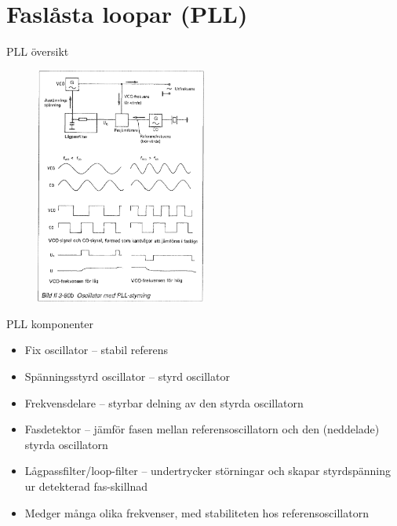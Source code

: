 \documentclass{beamer}
\begin{document}
\section{Faslåsta loopar (PLL)}

\begin{frame}{PLL översikt}

\begin{figure}[h]
\includegraphics[width=0.5\textwidth]{images/bild_2_3-80b}
\end{figure}

\end{frame}

\begin{frame}{PLL komponenter}
  \begin{itemize}
    \item Fix oscillator -- stabil referens
    \item Spänningsstyrd oscillator -- styrd oscillator
    \item Frekvensdelare -- styrbar delning av den styrda oscillatorn
    \item Fasdetektor -- jämför fasen mellan referensoscillatorn och den (neddelade) styrda oscillatorn
    \item Lågpassfilter/loop-filter -- undertrycker störningar och skapar styrdspänning ur detekterad fas-skillnad
    \item Medger många olika frekvenser, med stabiliteten hos referensoscillatorn
  \end{itemize}
\end{frame}
\end{document}
